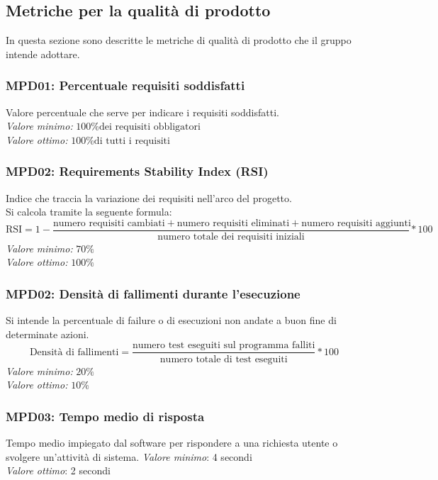 \subsection{Metriche per la qualità di prodotto}
In questa sezione sono descritte le metriche di qualità di prodotto che il gruppo intende adottare.

\subsubsection{MPD01: Percentuale requisiti soddisfatti}
Valore percentuale che serve per indicare i requisiti soddisfatti.\\
\textit{Valore minimo:} $100\% \text{dei requisiti obbligatori}$\\
\textit{Valore ottimo:} $100\% \text{di tutti i requisiti}$
\subsubsection{MPD02: Requirements Stability Index (RSI)}
Indice che traccia la variazione dei requisiti nell'arco del progetto.\\
Si calcola tramite la seguente formula:
\begin{equation*}
\text{RSI}=1-\frac{\text{numero requisiti cambiati}+\text{numero requisiti eliminati}+\text{numero requisiti aggiunti}}{\text{numero totale dei requisiti iniziali}}*100
\end{equation*}
\textit{Valore minimo:} $70\%$\\
\textit{Valore ottimo:} $100\%$

\subsubsection{MPD02: Densità di fallimenti durante l'esecuzione}
Si intende la percentuale di failure o di esecuzioni non andate a buon fine di determinate azioni.
\begin{equation*}
\text{Densità di fallimenti}=\frac{\text{numero test eseguiti sul programma falliti}}{\text{numero totale di test eseguiti}}*100
\end{equation*}
\textit{Valore minimo:} $20\%$\\
\textit{Valore ottimo:} $10\%$

\subsubsection{MPD03: Tempo medio di risposta}
Tempo medio impiegato dal software per rispondere a una richiesta utente o svolgere un’attività di sistema.
\textit{Valore minimo}: 4 secondi\\
\textit{Valore ottimo}: 2 secondi\\

